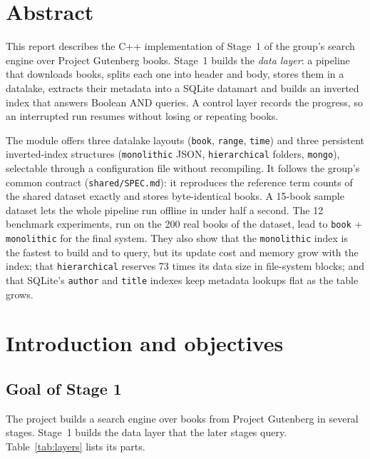 \documentclass[11pt,a4paper]{article}
\newcommand{\code}[1]{\texttt{#1}}
\begin{document}
\section*{Abstract}
This report describes the C++ implementation of Stage~1 of the group's search engine over Project
Gutenberg books. Stage~1 builds the \emph{data layer}: a pipeline that downloads books, splits each
one into header and body, stores them in a datalake, extracts their metadata into a SQLite datamart
and builds an inverted index that answers Boolean AND queries. A control layer records the progress,
so an interrupted run resumes without losing or repeating books.

The module offers three datalake layouts (\code{book}, \code{range}, \code{time}) and three persistent
inverted-index structures (\code{monolithic} JSON, \code{hierarchical} folders, \code{mongo}),
selectable through a configuration file without recompiling. It follows the group's common
contract (\code{shared/SPEC.md}): it reproduces the reference term counts of the shared dataset
exactly and stores byte-identical books. A 15-book sample dataset lets the whole pipeline run
offline in under half a second. The 12 benchmark experiments, run on the 200 real books of the dataset,
lead to \code{book} + \code{monolithic} for the final system. They also show that the
\code{monolithic} index is the fastest to build and to query, but its update cost and memory grow with
the index; that \code{hierarchical} reserves 73 times its data size in file-system blocks; and that
SQLite's \code{author} and \code{title} indexes keep metadata lookups flat as the table grows.

\tableofcontents
\newpage

\section{Introduction and objectives}

\subsection{Goal of Stage 1}
The project builds a search engine over books from Project Gutenberg in several stages. Stage~1
builds the data layer that the later stages query. Table~\ref{tab:layers} lists its parts.
\end{document}
